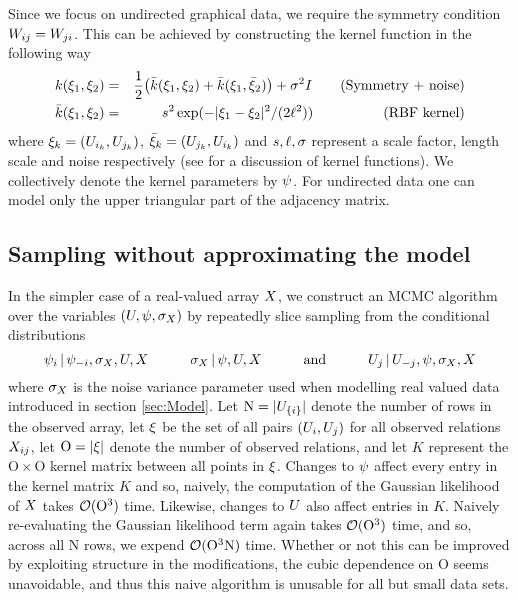 Since we focus on undirected graphical data, we require the symmetry condition $W_{ij} = W_{ji}$. This can be achieved by constructing the kernel function in the following way
\begin{eqnarray}
k(\xi_1, \xi_2) & = & \frac{1}{2}\big(\bar{k}(\xi_1, \xi_2) + \bar{k}(\xi_1, \bar{\xi}_2)\big) + \sigma^2I \quad \quad \textrm{(Symmetry + noise)} \\
\bar{k}(\xi_1, \xi_2) & = & s^2\exp(-|\xi_1 - \xi_2|^2/(2\ell^2)) \quad \quad \quad \quad \quad \textrm{(RBF kernel)}
\end{eqnarray}
where $\xi_k = (U_{i_k}, U_{j_k})$, $\bar{\xi}_k= (U_{j_k}, U_{i_k})$ and $s, \ell, \sigma$ represent a scale factor, length scale and noise respectively (see \citep[e.g.][]{Rasmussen2006} for a discussion of kernel functions). We collectively denote the kernel parameters by $\psi$.
For undirected data one can model only the upper triangular part of the adjacency matrix.

\subsection{Sampling without approximating the model}

\newcommand{\numobs}{\mathrm O}
\newcommand{\numnodes}{\mathrm N}
In the simpler case of a real-valued array $X$, we construct an MCMC algorithm over the variables $(U,\psi, \sigma_X)$ by repeatedly slice sampling \citep{MR1994729} from the conditional distributions
\[
\psi_i \,|\, \psi_{-i}, \sigma_X, U, X
\qquad\quad
\sigma_X \,|\, \psi, U, X
\qquad\quad \text{and} \qquad\quad
U_j \,|\, U_{-j}, \psi, \sigma_X, X
\]
where $\sigma_X$ is the noise variance parameter used when modelling real valued data introduced in section \ref{sec:Model}.
Let $\numnodes = |\AHvar_{\lbrace i\rbrace}|$ denote the number of rows in the observed array,
let $\xi$ be the set of all pairs $(U_i,U_j)$ for all observed relations $X_{ij}$, 
let $\numobs = |\inputpoints|$ denote the number of observed relations,
and 
let $K$ represent the $\numobs \times \numobs$ kernel matrix between all points in $\xi$. Changes to $\psi$ affect every entry in the kernel matrix $K$ and so, naively, the computation of the Gaussian likelihood of $X$ takes $\CompOrder(\numobs^3)$ time.  Likewise, changes to $U$ also affect entries in $K$. Naively re-evaluating the Gaussian likelihood term again takes $\CompOrder(\numobs^3)$ time, and so, across all $\numnodes$ rows, we expend $\CompOrder(\numobs^3 \numnodes)$ time. Whether or not this can be improved by exploiting structure in the modifications, the cubic dependence on $\numobs$ seems unavoidable, and thus this naive algorithm is unusable for all but small data sets. 


